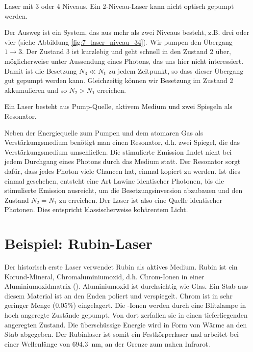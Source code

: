 \begin{marginfigure}
    \caption{Laser mit 3 oder 4 Niveaus. Ein 2-Niveau-Laser kann nicht optisch gepumpt werden.}
    \label{fig:7_laser_niveau_34}
\end{marginfigure}

Der Ausweg ist ein System, das aus mehr als zwei Niveaus besteht, z.B. drei oder vier (siehe Abbildung  \ref{fig:7_laser_niveau_34}). Wir pumpen den Übergang $1 \rightarrow 3$. Der Zustand 3 ist kurzlebig und geht schnell in den Zustand 2 über, möglicherweise unter Aussendung eines Photons, das uns hier nicht interessiert. Damit ist die Besetzung $N_3 \ll N_1$ zu jedem Zeitpunkt, so dass dieser Übergang gut gepumpt werden kann. Gleichzeitig können wir  Besetzung im Zustand 2 akkumulieren und so $N_2 > N_1$ erreichen.

\begin{marginfigure}
    \caption{Ein Laser besteht aus Pump-Quelle, aktivem Medium und zwei Spiegeln als Resonator.}
    \label{fig:7_laser_design}
\end{marginfigure}


Neben der Energiequelle zum Pumpen und dem atomaren Gas als Verstärkungsmedium benötigt man einen Resonator, d.h. zwei Spiegel, die das Verstärkungsmedium umschließen. Die stimulierte Emission findet nicht bei jedem Durchgang eines Photons durch das Medium statt.  Der Resonator sorgt dafür, dass jedes Photon viele Chancen hat, einmal kopiert zu werden. Ist dies einmal geschehen, entsteht eine Art Lawine identischer Photonen, bis die stimulierte Emission ausreicht, um die Besetzungsinversion abzubauen und den Zustand $N_2 = N_1$ zu erreichen. Der Laser ist also eine Quelle identischer Photonen. Dies entspricht klassischerweise kohärentem Licht.


\section{Beispiel: Rubin-Laser}

Der historisch erste Laser verwendet Rubin als aktives Medium. Rubin ist ein Korund-Mineral, Chromaluminiumoxid, d.h. Chrom-Ionen in einer Aluminiumoxidmatrix (). Aluminiumoxid ist durchsichtig wie Glas. Ein Stab aus diesem Material ist an den Enden poliert und verspiegelt. Chrom ist in sehr geringer Menge (0,05\%) eingelagert. Die -Ionen werden durch eine Blitzlampe in hoch angeregte Zustände gepumpt. Von dort zerfallen sie in einen tieferliegenden angeregten Zustand. Die überschüssige Energie wird in Form von Wärme an den Stab abgegeben. Der Rubinlaser ist somit ein Festkörperlaser und arbeitet bei einer Wellenlänge von 694.3~nm, an der Grenze zum nahen Infrarot. 

